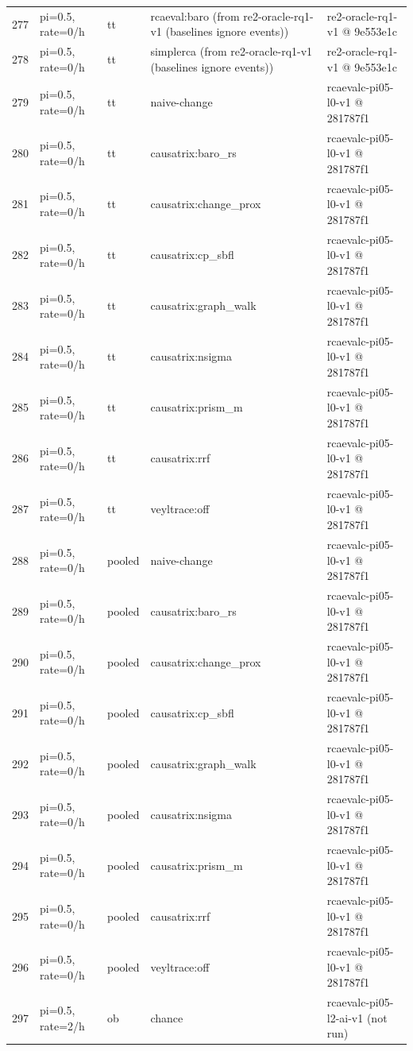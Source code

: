 \begin{longtable}{@{}r>{\raggedright\arraybackslash}p{48.0pt}>{\raggedright\arraybackslash}p{18.0pt}>{\raggedright\arraybackslash}p{108.0pt}>{\raggedright\arraybackslash}p{105.0pt}@{}}
277 & pi=0.5, rate=0/h & tt & rcaeval:baro (from re2-oracle-rq1-v1 (baselines ignore events)) & re2-oracle-rq1-v1 @ 9e553e1c \\
278 & pi=0.5, rate=0/h & tt & simplerca (from re2-oracle-rq1-v1 (baselines ignore events)) & re2-oracle-rq1-v1 @ 9e553e1c \\
279 & pi=0.5, rate=0/h & tt & naive-change & rcaevalc-pi05-l0-v1 @ 281787f1 \\
280 & pi=0.5, rate=0/h & tt & causatrix:baro\_rs & rcaevalc-pi05-l0-v1 @ 281787f1 \\
281 & pi=0.5, rate=0/h & tt & causatrix:change\_prox & rcaevalc-pi05-l0-v1 @ 281787f1 \\
282 & pi=0.5, rate=0/h & tt & causatrix:cp\_sbfl & rcaevalc-pi05-l0-v1 @ 281787f1 \\
283 & pi=0.5, rate=0/h & tt & causatrix:graph\_walk & rcaevalc-pi05-l0-v1 @ 281787f1 \\
284 & pi=0.5, rate=0/h & tt & causatrix:nsigma & rcaevalc-pi05-l0-v1 @ 281787f1 \\
285 & pi=0.5, rate=0/h & tt & causatrix:prism\_m & rcaevalc-pi05-l0-v1 @ 281787f1 \\
286 & pi=0.5, rate=0/h & tt & causatrix:rrf & rcaevalc-pi05-l0-v1 @ 281787f1 \\
287 & pi=0.5, rate=0/h & tt & veyltrace:off & rcaevalc-pi05-l0-v1 @ 281787f1 \\
288 & pi=0.5, rate=0/h & pooled & naive-change & rcaevalc-pi05-l0-v1 @ 281787f1 \\
289 & pi=0.5, rate=0/h & pooled & causatrix:baro\_rs & rcaevalc-pi05-l0-v1 @ 281787f1 \\
290 & pi=0.5, rate=0/h & pooled & causatrix:change\_prox & rcaevalc-pi05-l0-v1 @ 281787f1 \\
291 & pi=0.5, rate=0/h & pooled & causatrix:cp\_sbfl & rcaevalc-pi05-l0-v1 @ 281787f1 \\
292 & pi=0.5, rate=0/h & pooled & causatrix:graph\_walk & rcaevalc-pi05-l0-v1 @ 281787f1 \\
293 & pi=0.5, rate=0/h & pooled & causatrix:nsigma & rcaevalc-pi05-l0-v1 @ 281787f1 \\
294 & pi=0.5, rate=0/h & pooled & causatrix:prism\_m & rcaevalc-pi05-l0-v1 @ 281787f1 \\
295 & pi=0.5, rate=0/h & pooled & causatrix:rrf & rcaevalc-pi05-l0-v1 @ 281787f1 \\
296 & pi=0.5, rate=0/h & pooled & veyltrace:off & rcaevalc-pi05-l0-v1 @ 281787f1 \\
297 & pi=0.5, rate=2/h & ob & chance & rcaevalc-pi05-l2-ai-v1 (not run) \\

\end{longtable}
